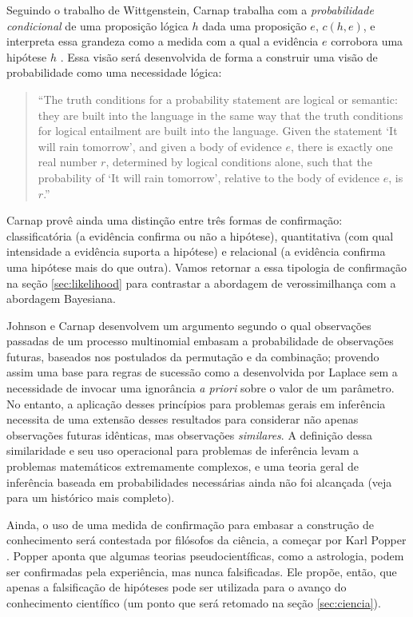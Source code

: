 Seguindo o trabalho de Wittgenstein, Carnap trabalha 
com a {\em probabilidade condicional} de uma proposição lógica $h$ dada uma proposição $e$, $c(h, e)$, 
e interpreta essa grandeza como a medida com a qual a evidência $e$ corrobora uma hipótese $h$ \citep{Zabell09}.
Essa visão será desenvolvida de forma a construir uma visão de probabilidade como uma necessidade lógica:

\begin{quote}
``The truth conditions for a probability statement are logical or semantic: they are built into the language in the same
way that the truth conditions for logical entailment are built into the language. Given the statement `It will rain tomorrow',
and given a body of evidence $e$, there is exactly one real number $r$, determined by logical conditions alone, such
that the probability of `It will rain tomorrow', relative to the body of evidence $e$, is $r$.'' \citep{Kyburg74}
\end{quote}

Carnap provê ainda uma distinção entre três formas de confirmação: classificatória (a evidência confirma ou não a hipótese),
quantitativa (com qual intensidade a evidência suporta a hipótese) e relacional (a evidência confirma uma hipótese mais do que
outra)\citep{Carnap62}. Vamos retornar a essa tipologia de confirmação na seção \ref{sec:likelihood} para contrastar
a abordagem de verossimilhança com a abordagem Bayesiana.

Johnson e Carnap desenvolvem um argumento segundo o qual observações passadas de um processo multinomial embasam a probabilidade
de observações futuras, baseados nos postulados da permutação e da combinação; 
provendo assim uma base para regras de sucessão como a 
desenvolvida por Laplace sem a necessidade de invocar uma ignorância {\em a priori} sobre o valor de um parâmetro. 
No entanto, a aplicação desses princípios para problemas gerais em inferência necessita de uma extensão desses resultados
para considerar não apenas observações futuras idênticas, mas observações {\em similares}. A definição dessa similaridade
e seu uso operacional para problemas de inferência levam a problemas matemáticos extremamente complexos, e uma teoria
geral de inferência baseada em probabilidades necessárias ainda não foi alcançada (veja \cite{Zabell09} para um histórico
mais completo).

Ainda, o uso de uma medida de confirmação para embasar a construção de conhecimento será contestada por filósofos
da ciência, a começar por Karl Popper \citep{Popper63}. Popper aponta que algumas teorias pseudocientíficas, como
a astrologia, podem ser confirmadas pela experiência, mas nunca falsificadas. Ele propõe, então, que apenas a 
falsificação de hipóteses pode ser utilizada para o avanço do conhecimento científico (um ponto que será retomado
na seção \ref{sec:ciencia}).

